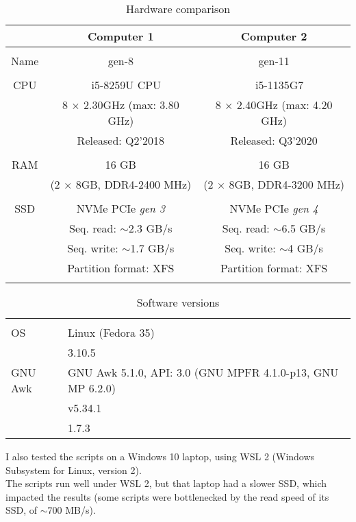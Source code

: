 \begin{table}[h]
	\caption{Hardware comparison}
	\centering
	\begin{tabular}{| c | c | c |}
		\hline
			& Computer 1 & Computer 2 \\
		\hline
			& & \\
		Name & gen-8 & gen-11 \\
			& & \\
		CPU & \Intel\ \Core\ i5-8259U CPU & \Intel\ \Core\ i5-1135G7 \\
		    & 8 $\times$ 2.30GHz (max: 3.80 GHz) & 8 $\times$ 2.40GHz (max: 4.20 GHz) \\
		    & \footnotesize Released: Q2'2018 & \footnotesize Released: Q3'2020 \\
			& & \\
		RAM & 16 GB & 16 GB \\
			& (2 $\times$ 8GB, DDR4-2400 MHz) & (2 $\times$ 8GB, DDR4-3200 MHz) \\
			& & \\
     	SSD & NVMe PCIe \emph{gen 3} & NVMe PCIe \emph{gen 4} \\
		    & Seq. read: $\sim$2.3 GB/s & Seq. read: $\sim$6.5 GB/s \\
     		& Seq. write: $\sim$1.7 GB/s & Seq. write: $\sim$4 GB/s \\
			& \footnotesize Partition format: XFS & \footnotesize Partition format: XFS \\
			& & \\
		\hline
	\end{tabular}
\end{table}

\begin{table}[h]
	\caption{Software versions}
	\centering
	\begin{tabular}{ l  l }
		& \\
		OS & Linux (Fedora 35) \\
		\python & 3.10.5 \\
		GNU Awk &  GNU Awk 5.1.0, API: 3.0 (GNU MPFR 4.1.0-p13, GNU MP 6.2.0) \\
		\perl & v5.34.1 \\
		\julia & 1.7.3 \\
\end{tabular}
\end{table}	



\medskip

I also tested the scripts on a Windows 10 laptop, using WSL 2 (Windows Subsystem for Linux, version 2). \\

The scripts run well under WSL 2, but that laptop had a slower SSD, which impacted the results (some scripts were bottlenecked by the read speed of its SSD, of $\sim$700 MB/s).


